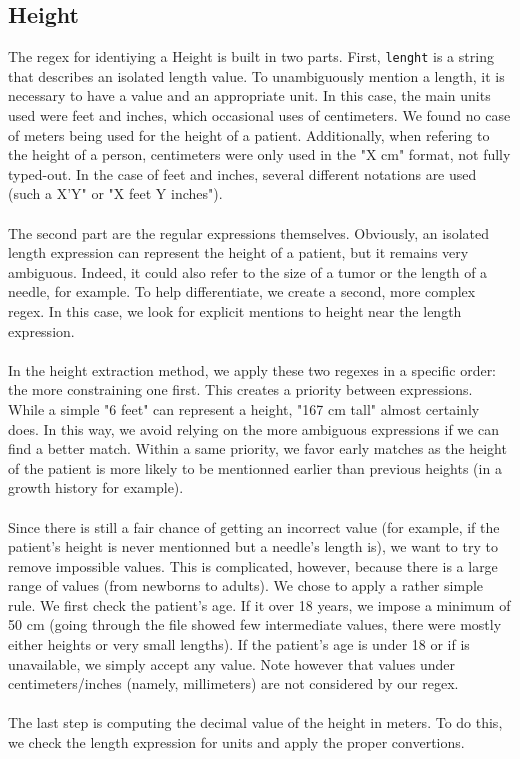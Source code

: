 \documentclass[10pt, a4paper, oneside]{article} %
\begin{document}
\subsection*{Height}
The regex for identiying a Height is built in two parts. First, \texttt{lenght} is a string that describes an isolated length value. To unambiguously mention a length, it is necessary to have a value and an appropriate unit. In this case, the main units used were feet and inches, which occasional uses of centimeters. We found no case of meters being used for the height of a patient. Additionally, when refering to the height of a person, centimeters were only used in the "X cm" format, not fully typed-out. In the case of feet and inches, several different notations are used (such a X'Y" or "X feet Y inches").\\
\\
The second part are the regular expressions themselves. Obviously, an isolated length expression can represent the height of a patient, but it remains very ambiguous. Indeed, it could also refer to the size of a tumor or the length of a needle, for example. To help differentiate, we create a second, more complex regex. In this case, we look for explicit mentions to height near the length expression.\\
\\
In the height extraction method, we apply these two regexes in a specific order: the more constraining one first. This creates a priority between expressions. While a simple "6 feet" can represent a height, "167  cm tall" almost certainly does. In this way, we avoid relying on the more ambiguous expressions if we can find a better match. Within a same priority, we favor early matches as the height of the patient is more likely to be mentionned earlier than previous heights (in a growth history for example).\\
\\
Since there is still a fair chance of getting an incorrect value (for example, if the patient's height is never mentionned but a needle's length is), we want to try to remove impossible values. This is complicated, however, because there is a large range of values (from newborns to adults). We chose to apply a rather simple rule. We first check the patient's age. If it over 18 years, we impose a minimum of 50 cm (going through the file showed few intermediate values, there were mostly either heights or very small lengths). If the patient's age is under 18 or if is unavailable, we simply accept any value. Note however that values under centimeters/inches (namely, millimeters) are not considered by our regex. \\
\\
The last step is computing the decimal value of the height in meters. To do this, we check the length expression for units and apply the proper convertions.
\end{document}
